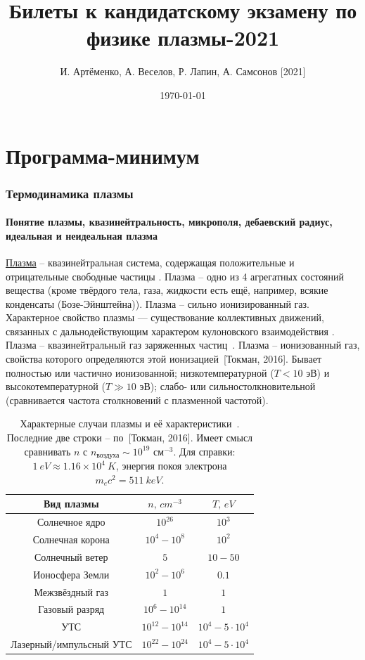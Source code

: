 \documentclass[10pt, a4paper]{article}
\title{Билеты к кандидатскому экзамену по физике плазмы-2021}
\author{И. Артёменко, А. Веселов, Р. Лапин, А. Самсонов [2021]}
\date{\today}
\newcommand{\Tokman}{~[Токман, 2016]}
\let\stdsection\section
\renewcommand\section{\newpage\stdsection}
\let\stdpart\part
\renewcommand{\part}{\newpage\stdpart}
\begin{document}
\maketitle

\tableofcontents

\part{Программа-минимум}

\section{Термодинамика плазмы}

\subsection{Понятие плазмы, квазинейтральность, микрополя, дебаевский радиус, идеальная и неидеальная плазма}

\uline{Плазма} -- квазинейтральная система, содержащая положительные и отрицательные свободные частицы \cite{frank}. Плазма -- одно из 4 агрегатных состояний вещества (кроме твёрдого тела, газа, жидкости есть ещё, например, всякие конденсаты (Бозе-Эйнштейна)). Плазма -- сильно ионизированный газ. Характерное свойство плазмы — существование коллективных
движений, связанных с дальнодействующим характером кулоновского взаимодействия \cite{kroll}. Плазма -- квазинейтральный газ заряженных частиц~\cite{kotelnikov}. Плазма -- ионизованный газ, свойства которого определяются этой ионизацией\Tokman. Бывает полностью или частично ионизованной; низкотемпературной ($T<10$ эВ) и высокотемпературной ($T\gg10$ эВ); слабо- или сильностолкновительной (сравнивается частота столкновений с плазменной частотой).

\begin{table}[ht]
	\caption{Характерные случаи плазмы и её характеристики~\cite{kotelnikov}. Последние две строки -- по\Tokman. Имеет смысл сравнивать $n$ с $n_\text{воздуха} \sim 10^{19}$ см$^{-3}$.	Для справки: $1\ eV \approx 1.16\times 10^{4}\ K$, энергия покоя электрона $m_e c^2 = 511\ keV$.}
	\begin{center}
		\begin{tabular}{|c|c|c|}
			\hline
			Вид плазмы & $n,\,cm^{-3}$ & $T,\,eV$ \\ \hline
			Солнечное ядро & $10^{26}$ & $10^3$ \\
			Солнечная корона & $10^4-10^8$ & $10^2$ \\
			Солнечный ветер & $5$ & $10-50$ \\
			Ионосфера Земли & $10^2-10^6$ & $0.1$ \\
			Межзвёздный газ & $1$ & $1$ \\
			Газовый разряд & $10^{6}-10^{14}$ & $1$ \\
			УТС & $10^{12}-10^{14}$ & $10^4-5\cdot10^4$ \\
			Лазерный/импульсный УТС & $10^{22}-10^{24}$ & $10^4-5\cdot10^4$ \\
			\hline
		\end{tabular}
	\end{center}
\end{table}
\end{document}
